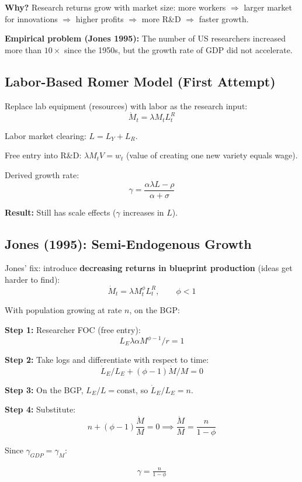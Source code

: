 \documentclass[a4paper,11pt]{article}
\begin{document}
\textbf{Why?} Research returns grow with market size: more workers $\Rightarrow$ larger market for innovations $\Rightarrow$ higher profits $\Rightarrow$ more R\&D $\Rightarrow$ faster growth.

\textbf{Empirical problem (Jones 1995):} The number of US researchers increased more than $10\times$ since the 1950s, but the growth rate of GDP did not accelerate.

\subsection*{Labor-Based Romer Model (First Attempt)}

Replace lab equipment (resources) with labor as the research input:
\[
\dot{M}_t = \lambda M_t L_t^R
\]

Labor market clearing: $L = L_Y + L_R$.

Free entry into R\&D: $\lambda M_t V = w_t$ (value of creating one new variety equals wage).

Derived growth rate:
\[
\gamma = \frac{\alpha \lambda L - \rho}{\alpha + \sigma}
\]

\textbf{Result:} Still has scale effects ($\gamma$ increases in $L$).

\subsection*{Jones (1995): Semi-Endogenous Growth}

Jones' fix: introduce \textbf{decreasing returns in blueprint production} (ideas get harder to find):
\[
\dot{M}_t = \lambda M_t^\phi L_t^R, \qquad \phi < 1
\]

With population growing at rate $n$, on the BGP:

\begin{derivationbox}
\textbf{Step 1:} Researcher FOC (free entry):
\[
L_E \lambda \alpha M^{\phi-1} / r = 1
\]

\textbf{Step 2:} Take logs and differentiate with respect to time:
\[
\dot{L}_E/L_E + (\phi - 1)\dot{M}/M = 0
\]

\textbf{Step 3:} On the BGP, $L_E/L = \text{const}$, so $\dot{L}_E/L_E = n$.

\textbf{Step 4:} Substitute:
\[
n + (\phi - 1)\frac{\dot{M}}{M} = 0 \implies \frac{\dot{M}}{M} = \frac{n}{1-\phi}
\]

Since $\gamma_{GDP} = \gamma_M$:
\end{derivationbox}

\begin{resultbox}
\begin{align*}
\boxed{\gamma = \frac{n}{1-\phi}}
\tag{Jones Semi-Endogenous}
\end{align*}
\end{resultbox}
\end{document}
